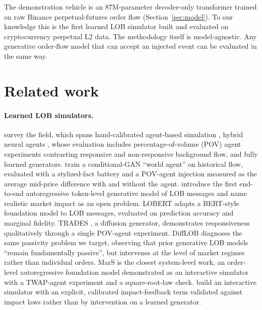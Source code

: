 \documentclass[sigconf,anonymous]{acmart}
\begin{document}
The demonstration vehicle is an 87M-parameter decoder-only transformer trained on raw Binance perpetual-futures order flow (Section~\ref{sec:model}). To our knowledge this is the first learned LOB simulator built and evaluated on cryptocurrency perpetual L2 data. The methodology itself is model-agnostic. Any generative order-flow model that can accept an injected event can be evaluated in the same way.

\section{Related work}
\label{sec:related}

\paragraph{Learned LOB simulators.} \citet{jain2024} survey the field, which spans hand-calibrated agent-based simulation \citep{abides2019}, hybrid neural agents \citep{shi2023}, whose evaluation includes percentage-of-volume (POV) agent experiments contrasting responsive and non-responsive background flow, and fully learned generators. \citet{coletta2021,coletta2022} train a conditional-GAN ``world agent'' on historical flow, evaluated with a stylized-fact battery and a POV-agent injection measured as the average mid-price difference with and without the agent. \citet{nagy2023} introduce the first end-to-end autoregressive token-level generative model of LOB messages and name realistic market impact as an open problem. LOBERT \citep{lobert2025} adapts a BERT-style foundation model to LOB messages, evaluated on prediction accuracy and marginal fidelity. TRADES \citep{trades2025}, a diffusion generator, demonstrates responsiveness qualitatively through a single POV-agent experiment. DiffLOB \citep{difflob2026} diagnoses the same passivity problem we target, observing that prior generative LOB models ``remain fundamentally passive'', but intervenes at the level of market regimes rather than individual orders. MarS \citep{mars2025} is the closest system-level work, an order-level autoregressive foundation model demonstrated as an interactive simulator with a TWAP-agent experiment and a square-root-law check. \citet{noble2026} build an interactive simulator with an explicit, calibrated impact-feedback term validated against impact laws rather than by intervention on a learned generator.
\end{document}
